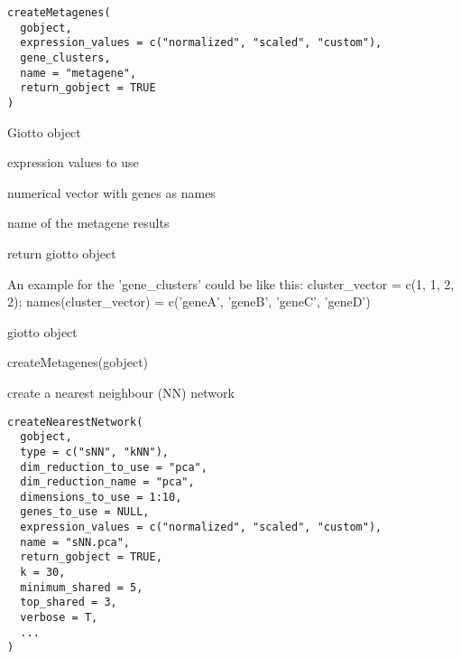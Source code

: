 \documentclass[a4paper]{book}
\begin{document}
%
\begin{Usage}
\begin{verbatim}
createMetagenes(
  gobject,
  expression_values = c("normalized", "scaled", "custom"),
  gene_clusters,
  name = "metagene",
  return_gobject = TRUE
)
\end{verbatim}
\end{Usage}
%
\begin{Arguments}
\begin{ldescription}
\item[\code{gobject}] Giotto object

\item[\code{expression\_values}] expression values to use

\item[\code{gene\_clusters}] numerical vector with genes as names

\item[\code{name}] name of the metagene results

\item[\code{return\_gobject}] return giotto object
\end{ldescription}
\end{Arguments}
%
\begin{Details}\relax
An example for the 'gene\_clusters' could be like this:
cluster\_vector = c(1, 1, 2, 2); names(cluster\_vector) = c('geneA', 'geneB', 'geneC', 'geneD')
\end{Details}
%
\begin{Value}
giotto object
\end{Value}
%
\begin{Examples}
\begin{ExampleCode}
    createMetagenes(gobject)
\end{ExampleCode}
\end{Examples}
%
\begin{Description}\relax
create a nearest neighbour (NN) network
\end{Description}
%
\begin{Usage}
\begin{verbatim}
createNearestNetwork(
  gobject,
  type = c("sNN", "kNN"),
  dim_reduction_to_use = "pca",
  dim_reduction_name = "pca",
  dimensions_to_use = 1:10,
  genes_to_use = NULL,
  expression_values = c("normalized", "scaled", "custom"),
  name = "sNN.pca",
  return_gobject = TRUE,
  k = 30,
  minimum_shared = 5,
  top_shared = 3,
  verbose = T,
  ...
)
\end{verbatim}
\end{Usage}
\end{document}
